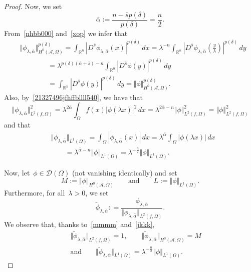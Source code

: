 \documentclass[11pt,hyp,]{nyjm}
\numberwithin{equation}{section}
\newcommand{\R}{\mathbb{R}}
\theoremstyle{remark}
\begin{document}
\begin{proof}
Now, we set
\begin{equation}\label{21327496jfhffbllll540}
\bar{\alpha}:= \frac{n-\bar{s} p(\delta)}{p(\delta)}=\frac{n}2.
\end{equation}
{F}rom~\eqref{nhbb000} and~\eqref{xop} %
we infer that
\begin{equation}\begin{split}\label{mmmm}&
\Vert\phi_{\lambda, \bar{\alpha}} \Vert^{p(\delta)}_{H^0(\mathcal{A},\Omega)}= \int_{\R^n}|D^{\bar{s}} \phi_{\lambda, \bar{\alpha}}(x)|^{p(\delta)} \, dx = \lambda^{-n}\int_{\R^n} \left|D^{\bar{s}} \phi_{\lambda, \bar{\alpha}}\left(\frac{y}{\lambda}\right)\right|^{p(\delta)} \, dy  \\&\qquad\qquad
= \lambda^{p(\delta)(\bar{\alpha}+\bar{s})-n}\int_{\R^n} \left|D^{\bar{s}} \phi (y) \right|^{p(\delta)} \, dy \\&\qquad\qquad= \int_{\R^n} \left|D^{\bar{s}} \phi (y) \right|^{p(\delta)} \, dy = \Vert\phi\Vert_{H^0(\mathcal{A},\Omega)}^{p(\delta)}.
\end{split}\end{equation}
Also, by~\eqref{21327496jfhffbllll540}, we have that
\begin{equation}\label{opop}
\Vert \phi_{\lambda,\bar{\alpha}} \Vert_{L^2(f, \Omega)}^2 =  \lambda^{2 \bar{\alpha}} \int_{\Omega} f(x)|\phi(\lambda x)|^2 \, dx = \lambda^{2 \bar{\alpha} -n} \Vert \phi \Vert^2_{L^2(f,\Omega)} = \Vert \phi \Vert^2_{L^2(f,\Omega)}
\end{equation}
and that
\begin{equation}\label{jkkk}\begin{split}&
\Vert  \phi_{\lambda, \bar{\alpha}} \Vert_{L^{1}(\Omega)} = \int_{\Omega}\left|\phi_{\lambda, \bar{\alpha}}(x)\right| \, dx =\lambda^{\bar{\alpha}} \int_{\Omega} \left|\phi(\lambda x)\right| \, dx 
\\&\qquad= \lambda^{\bar{\alpha}-n} \Vert \phi \Vert_{L^1(\Omega)} = \lambda^{-\frac{n}2} \Vert \phi \Vert_{L^1(\Omega)}.\end{split}
\end{equation}

{N}ow, let~$\phi \in \mathcal{D}(\Omega)$ (not vanishing identically)
and set
\begin{equation*}
M:=\Vert \phi \Vert_{H^0(\mathcal{A},\Omega)} \qquad {\mbox{and}} \qquad L:=
\Vert \phi \Vert_{L^1(\Omega)} .
\end{equation*}
Furthermore, for all~$\lambda>0$, we set
\begin{equation}\label{mdss}
\widetilde{\phi}_{\lambda, \bar{\alpha}}: = \frac{\phi_{\lambda, \bar{\alpha}}}{\Vert \phi_{\lambda, \bar{\alpha}} \Vert_{L^2(f,\Omega)}}.
\end{equation}
We observe that, thanks to~\eqref{mmmm} and~\eqref{jkkk},
\begin{eqnarray*}&& \Vert \widetilde\phi_{\lambda, \bar{\alpha}} \Vert_{L^2(f,\Omega)}=1,\qquad
\Vert \widetilde{\phi}_{\lambda, \bar{\alpha}} \Vert_{H^0(\mathcal{A},\Omega)} =M\\&& {\mbox{and}}\qquad
\Vert \widetilde{\phi}_{\lambda, \bar{\alpha}} \Vert_{L^1(\Omega)}=
\lambda^{-\frac{n}2} \Vert \phi \Vert_{L^1(\Omega)}
.\end{eqnarray*}


\end{proof}
\end{document}
